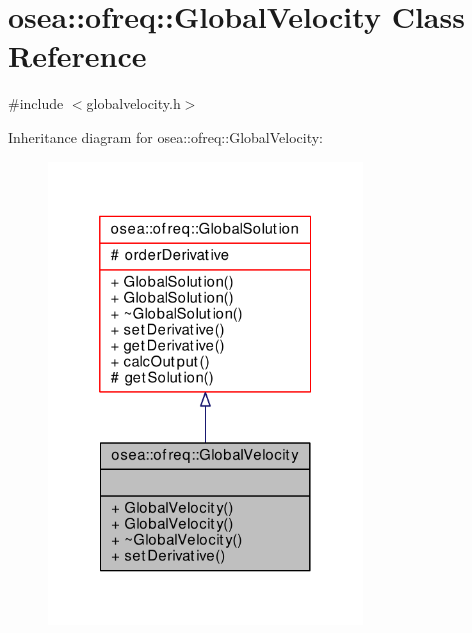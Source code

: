 \hypertarget{classosea_1_1ofreq_1_1_global_velocity}{\section{osea\-:\-:ofreq\-:\-:Global\-Velocity Class Reference}
\label{classosea_1_1ofreq_1_1_global_velocity}
}


{\ttfamily \#include $<$globalvelocity.\-h$>$}



Inheritance diagram for osea\-:\-:ofreq\-:\-:Global\-Velocity\-:\nopagebreak
\begin{figure}[H]
\begin{center}
\leavevmode
\includegraphics[width=236pt]{classosea_1_1ofreq_1_1_global_velocity__inherit__graph}
\end{center}
\end{figure}
